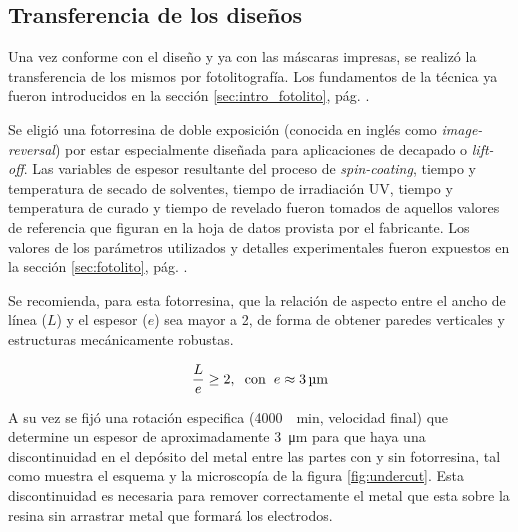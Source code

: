 { 		\subsection{Transferencia de los diseños}

 			 Una vez conforme con el diseño y ya con las máscaras impresas, se realizó la transferencia de los mismos por fotolitografía. Los fundamentos de la técnica ya fueron introducidos en la sección \ref{sec:intro_fotolito}, pág. \pageref{sec:intro_fotolito}.

 			 Se eligió una fotorresina de doble exposición (conocida en inglés como \textit{image-reversal}) por estar especialmente diseñada para aplicaciones de decapado o \textit{lift-off}. Las variables de espesor resultante del proceso de \textit{spin-coating}, tiempo y temperatura de secado de solventes, tiempo de irradiación UV, tiempo y temperatura de curado y tiempo de revelado fueron tomados de aquellos valores de referencia que figuran en la hoja de datos provista por el fabricante. \cite{TI35E} Los valores de los parámetros utilizados y detalles experimentales fueron expuestos en la sección \ref{sec:fotolito}, pág. \pageref{sec:fotolito}.

 			 Se recomienda, para esta fotorresina, que la relación de aspecto entre el ancho de línea ($L$) y el espesor ($e$) sea mayor a 2, de forma de obtener paredes verticales y estructuras mecánicamente robustas. 

 				\begin{equation}
				\frac{L}{e} \geq 2, \hspace*{0.2cm}\text{con}\hspace{0.2cm}  e \approx \SI{3}{\um}		
 				\end{equation}

     		 A su vez se fijó una rotación especifica (\SI{4000}{\per\minute}, velocidad final) que determine un espesor de aproximadamente \SI{3}{\um} para que haya una discontinuidad en el depósito del metal entre las partes con y sin fotorresina, tal como muestra el esquema y la microscopía de la figura \ref{fig:undercut}. Esta discontinuidad es necesaria para remover correctamente el metal que esta sobre la resina sin arrastrar metal que formará los electrodos. 

}
